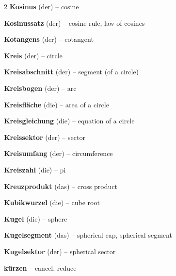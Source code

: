 \begin{multicols}{2}
\textbf{Kosinus} (der) -- cosine\dotfill\hyperref[e:133]{\pageref*{e:133}}\par
\textbf{Kosinussatz} (der) -- cosine rule, law of cosines\dotfill\hyperref[e:141]{\pageref*{e:141}}\par
\textbf{Kotangens} (der) -- cotangent\dotfill\hyperref[e:135]{\pageref*{e:135}}\par
\textbf{Kreis} (der) -- circle\dotfill\hyperref[e:211]{\pageref*{e:211}}\par
\textbf{Kreisabschnitt} (der) -- segment (of a circle)\dotfill\hyperref[e:222]{\pageref*{e:222}}\par
\textbf{Kreisbogen} (der) -- arc\dotfill\hyperref[e:221]{\pageref*{e:221}}\par
\textbf{Kreisfläche} (die) -- area of a circle\dotfill\hyperref[e:223]{\pageref*{e:223}}\par
\textbf{Kreisgleichung} (die) -- equation of a circle\dotfill\hyperref[e:313]{\pageref*{e:313}}\par
\textbf{Kreissektor} (der) -- sector\dotfill\hyperref[e:217]{\pageref*{e:217}}\par
\textbf{Kreisumfang} (der) -- circumference\dotfill\hyperref[e:215]{\pageref*{e:215}}\par
\textbf{Kreiszahl} (die) -- pi\dotfill\hyperref[e:216]{\pageref*{e:216}}\par
\textbf{Kreuzprodukt} (das) -- cross product\dotfill\hyperref[e:307]{\pageref*{e:307}}\par
\textbf{Kubikwurzel} (die) -- cube root\dotfill\hyperref[e:46]{\pageref*{e:46}}\par
\textbf{Kugel} (die) -- sphere\dotfill\hyperref[e:232]{\pageref*{e:232}}\par
\textbf{Kugelsegment} (das) -- spherical cap, spherical segment\dotfill\hyperref[e:240]{\pageref*{e:240}}\par
\textbf{Kugelsektor} (der) -- spherical sector\dotfill\hyperref[e:241]{\pageref*{e:241}}\par
\textbf{kürzen} -- cancel, reduce\dotfill\hyperref[e:37]{\pageref*{e:37}}\par


\end{multicols}
